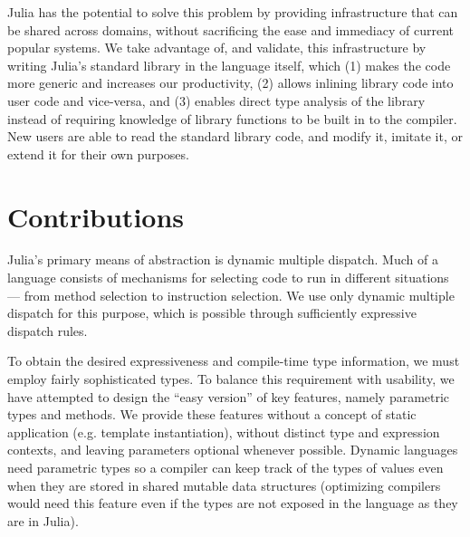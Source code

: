 \documentclass[9pt]{sigplanconf}
\begin{document}

Julia has the potential to solve this problem by providing infrastructure
that can be shared across domains, without sacrificing the ease and
immediacy of current popular systems. We take advantage of, and validate,
this infrastructure by writing Julia's standard library in the language
itself, which (1) makes the code more generic and increases our
productivity, (2) allows inlining library code into user code and
vice-versa, and (3) enables direct type analysis of the library instead of
requiring knowledge of library functions to be built in to the compiler.
New users are able to read the standard library code, and modify it,
imitate it, or extend it for their own purposes.


\section{Contributions}

Julia's primary means of abstraction is dynamic multiple dispatch.
Much of a language consists of mechanisms for selecting
code to run in different situations --- from method selection to
instruction selection. We use only dynamic multiple dispatch for this
purpose, which is possible through sufficiently expressive
dispatch rules.

To obtain the desired expressiveness and compile-time type information,
we must employ fairly sophisticated types. To balance this
requirement with usability, we have attempted to design the
``easy version'' of key features, namely parametric types and methods.
We provide these features without a concept of static application
(e.g. template instantiation), without distinct type and expression
contexts, and leaving parameters optional whenever possible.
Dynamic languages need parametric types so a compiler can keep track
of the types of values even when they are stored in shared mutable data
structures (optimizing compilers would need this feature even if the
types are not exposed in the language as they are in Julia).

\end{document}
